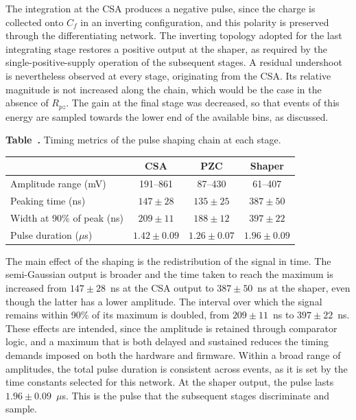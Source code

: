 The integration at the CSA produces a negative pulse, since the charge is collected onto $C_f$ in an inverting configuration, and this polarity is preserved through the differentiating network. The inverting topology adopted for the last integrating stage restores a positive output at the shaper, as required by the single-positive-supply operation of the subsequent stages. A residual undershoot is nevertheless observed at every stage, originating from the CSA. Its relative magnitude is not increased along the chain, which would be the case in the absence of $R_{pz}$. The gain at the final stage was decreased, so that events of this energy are sampled towards the lower end of the available bins, as discussed. 

\vspace{1em}

\label{tab:shaping}
\noindent\textbf{Table~\thetable.} Timing metrics of the pulse shaping chain at each stage.

\vspace{0.1em}

\begin{table}[H]
  \centering
  \setlength{\tabcolsep}{16pt}
  \renewcommand{\arraystretch}{1.65}
  \begin{tabular}{l c c c}
    \toprule
     & \textbf{CSA} & \textbf{PZC} & \textbf{Shaper} \\
    \midrule
    Amplitude range (mV)            & 191--861        & 87--430         & 61--407         \\
    Peaking time (ns)               & $147 \pm 28$    & $135 \pm 25$    & $387 \pm 50$    \\
    Width at 90\% of peak (ns)      & $209 \pm 11$    & $188 \pm 12$    & $397 \pm 22$    \\
    Pulse duration ($\mu$s)         & $1.42 \pm 0.09$ & $1.26 \pm 0.07$ & $1.96 \pm 0.09$ \\
    \bottomrule
  \end{tabular}
\end{table}

The main effect of the shaping is the redistribution of the signal in time. The semi-Gaussian output is broader and the time taken to reach the maximum is increased from $147 \pm 28$~ns at the CSA output to $387 \pm 50$~ns at the shaper, even though the latter has a lower amplitude. The interval over which the signal remains within 90\% of its maximum is doubled, from $209 \pm 11$~ns to $397 \pm 22$~ns. These effects are intended, since the amplitude is retained through comparator logic, and a maximum that is both delayed and sustained reduces the timing demands imposed on both the hardware and firmware. Within a broad range of amplitudes, the total pulse duration is consistent across events, as it is set by the time constants selected for this network. At the shaper output, the pulse lasts $1.96 \pm 0.09$~$\mu$s. This is the pulse that the subsequent stages discriminate and sample.
